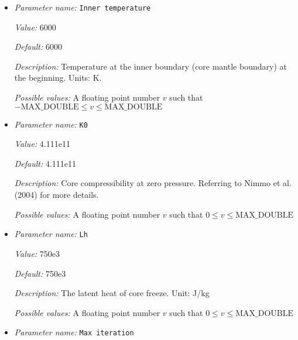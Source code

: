 \begin{itemize}
{\it Value:} 0.01


{\it Default:} 0.01


{\it Description:} Initial light composition (eg. S,O) concentration in weight fraction.


{\it Possible values:} A floating point number $v$ such that $0 \leq v \leq \text{MAX\_DOUBLE}$
\item {\it Parameter name:} {\tt Inner temperature}
\label{parameters:Boundary temperature model/Dynamic core/Inner temperature}


{\it Value:} 6000


{\it Default:} 6000


{\it Description:} Temperature at the inner boundary (core mantle boundary) at the beginning. Units: K.


{\it Possible values:} A floating point number $v$ such that $-\text{MAX\_DOUBLE} \leq v \leq \text{MAX\_DOUBLE}$
\item {\it Parameter name:} {\tt K0}
\label{parameters:Boundary temperature model/Dynamic core/K0}


{\it Value:} 4.111e11


{\it Default:} 4.111e11


{\it Description:} Core compressibility at zero pressure. Referring to Nimmo et al. (2004) for more details.


{\it Possible values:} A floating point number $v$ such that $0 \leq v \leq \text{MAX\_DOUBLE}$
\item {\it Parameter name:} {\tt Lh}
\label{parameters:Boundary temperature model/Dynamic core/Lh}


{\it Value:} 750e3


{\it Default:} 750e3


{\it Description:} The latent heat of core freeze. Unit: J/kg


{\it Possible values:} A floating point number $v$ such that $0 \leq v \leq \text{MAX\_DOUBLE}$
\item {\it Parameter name:} {\tt Max iteration}
\label{parameters:Boundary temperature model/Dynamic core/Max iteration}



\end{itemize}
